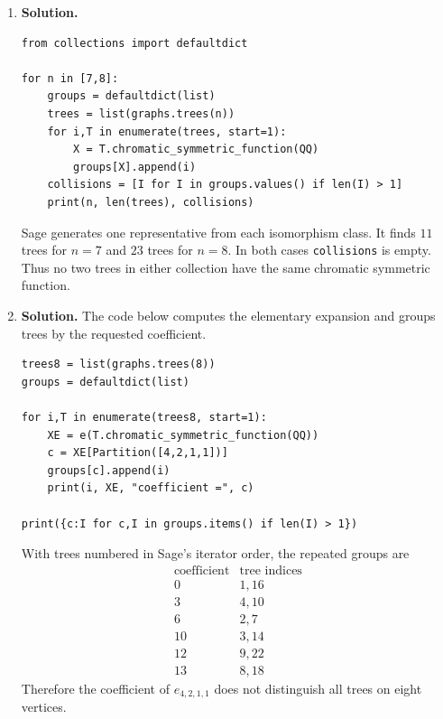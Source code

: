 \documentclass{article}
\begin{document}
\begin{enumerate}
\item \textbf{Solution.}
\begin{verbatim}
from collections import defaultdict

for n in [7,8]:
    groups = defaultdict(list)
    trees = list(graphs.trees(n))
    for i,T in enumerate(trees, start=1):
        X = T.chromatic_symmetric_function(QQ)
        groups[X].append(i)
    collisions = [I for I in groups.values() if len(I) > 1]
    print(n, len(trees), collisions)
\end{verbatim}
Sage generates one representative from each isomorphism class.  It
finds $11$ trees for $n=7$ and $23$ trees for $n=8$.  In both cases
\texttt{collisions} is empty.  Thus no two trees in either collection
have the same chromatic symmetric function.

\item \textbf{Solution.}
The code below computes the elementary expansion and groups trees by
the requested coefficient.
\begin{verbatim}
trees8 = list(graphs.trees(8))
groups = defaultdict(list)

for i,T in enumerate(trees8, start=1):
    XE = e(T.chromatic_symmetric_function(QQ))
    c = XE[Partition([4,2,1,1])]
    groups[c].append(i)
    print(i, XE, "coefficient =", c)

print({c:I for c,I in groups.items() if len(I) > 1})
\end{verbatim}
With trees numbered in Sage's iterator order, the repeated groups are
\[
\begin{array}{c|c}
\mbox{coefficient}&\mbox{tree indices}\\ \hline
0&1,16\\
3&4,10\\
6&2,7\\
10&3,14\\
12&9,22\\
13&8,18
\end{array}
\]
Therefore the coefficient of $e_{4,2,1,1}$ does not distinguish all
trees on eight vertices.


\end{enumerate}
\end{document}
